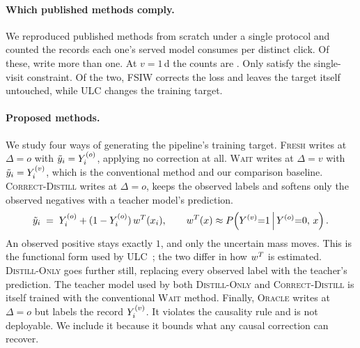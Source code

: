 \paragraph{Which published methods comply.}
We reproduced \nScreened{} published methods from scratch under a single protocol and counted
the records each one's served model consumes per distinct click. Of these, \nFail{} write
more than one.
At $v=1$\,d the counts are . 
Only \passList{} satisfy the single-visit constraint. Of the two, FSIW corrects the loss and leaves the target itself untouched,
while ULC changes the training target.

\paragraph{Proposed methods.}
We study four ways of generating the pipeline's training target. 
\textsc{Fresh} writes at
$\Delta=o$ with $\tilde y_i=Y^{(o)}_i$, applying no correction at all. \textsc{Wait} writes at
$\Delta=v$ with $\tilde y_i=Y^{(v)}_i$, which is the conventional method and our comparison baseline.
\textsc{Correct-Distill} writes at $\Delta=o$, keeps the observed
labels and softens only the observed negatives with a teacher model's prediction.
\begin{equation}
  \tilde y_i \;=\; Y^{(o)}_i + (1-Y^{(o)}_i)\,w^{T}(x_i),
  \qquad
  w^{T}(x) \approx P\!\left(Y^{(v)}{=}1 \,\middle|\, Y^{(o)}{=}0,\, x\right).
  \label{eq:hybrid}
\end{equation}
An observed positive stays exactly $1$, and only the uncertain mass moves. This is the functional
form used by ULC~\cite{wang2023unbiased}; the two differ in how $w^{T}$ is estimated. 
\textsc{Distill-Only} goes further still, replacing every observed label with the teacher's
prediction. The teacher model used by both \textsc{Distill-Only} and \textsc{Correct-Distill}
is itself trained with the conventional \textsc{Wait} method.
Finally, \textsc{Oracle} writes at $\Delta=o$ but labels the record
$Y^{(v)}_i$. It violates the causality rule and is not deployable. We include it because it bounds what any
causal correction can recover.

